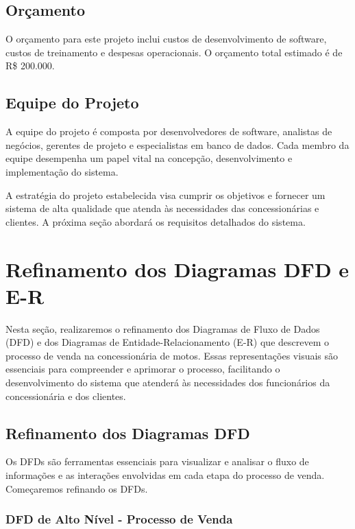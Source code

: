 \subsection{Orçamento}

O orçamento para este projeto inclui custos de desenvolvimento de software, custos de treinamento e despesas operacionais. O orçamento total estimado é de R\$ 200.000.

\subsection{Equipe do Projeto}

A equipe do projeto é composta por desenvolvedores de software, analistas de negócios, gerentes de projeto e especialistas em banco de dados. Cada membro da equipe desempenha um papel vital na concepção, desenvolvimento e implementação do sistema.

A estratégia do projeto estabelecida visa cumprir os objetivos e fornecer um sistema de alta qualidade que atenda às necessidades das concessionárias e clientes. A próxima seção abordará os requisitos detalhados do sistema.


\section{Refinamento dos Diagramas DFD e E-R}

Nesta seção, realizaremos o refinamento dos Diagramas de Fluxo de Dados (DFD) e dos Diagramas de Entidade-Relacionamento (E-R) que descrevem o processo de venda na concessionária de motos. Essas representações visuais são essenciais para compreender e aprimorar o processo, facilitando o desenvolvimento do sistema que atenderá às necessidades dos funcionários da concessionária e dos clientes.

\subsection{Refinamento dos Diagramas DFD}

Os DFDs são ferramentas essenciais para visualizar e analisar o fluxo de informações e as interações envolvidas em cada etapa do processo de venda. Começaremos refinando os DFDs.

\subsubsection{DFD de Alto Nível - Processo de Venda}

